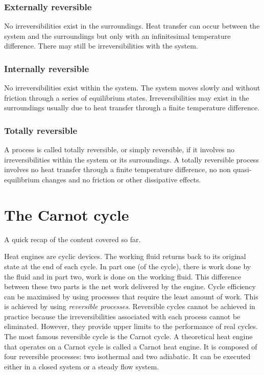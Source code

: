 \documentclass[class=report, crop=false, 12pt,a4paper]{standalone}
\begin{document}
\subsubsection{Externally reversible}
No irreversibilities exist in the surroundings. Heat transfer can occur between the system and the surroundings but only with an infinitesimal temperature difference. There may still be irreversibilities with the system.
\subsubsection{Internally reversible}
No irreversibilities exist within the system. The system moves slowly and without friction through a series of equilibrium states. Irreversibilities may exist in the surroundings usually due to heat transfer through a finite temperature difference.
\subsubsection{Totally reversible}
A process is called totally reversible, or simply reversible, if it involves no irreversibilities within the system or its surroundings. A totally reversible process involves no heat transfer through a finite temperature difference, no non quasi-equilibrium changes and no friction or other dissipative effects.
\section{The Carnot cycle}
A quick recap of the content covered so far.

Heat engines are cyclic devices. The working fluid returns back to its original state at the end of each cycle. In part one (of the cycle), there is work done by the fluid and in part two, work is done on the working fluid. This difference between these two parts is the net work delivered by the engine. Cycle efficiency can be maximised by using processes that require the least amount of work. This is achieved by using \emph{reversible processes}. Reversible cycles cannot be achieved in practice because the irreversibilities associated with each process cannot be eliminated. However, they provide upper limits to the performance of real cycles. The most famous reversible cycle is the Carnot cycle. A theoretical heat engine that operates on a Carnot cycle is called a Carnot heat engine. It is composed of four reversible processes: two isothermal and two adiabatic. It can be executed either in a closed system or a steady flow system.
\end{document}
